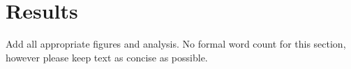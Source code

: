 
\section{Results}
\label{sec:results}
Add all appropriate figures and analysis.
No formal word count for this section, however
please keep text as concise as possible.
